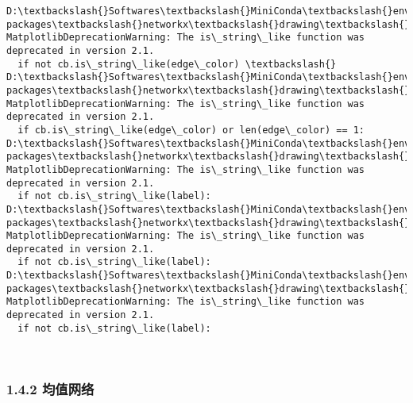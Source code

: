 \documentclass[11pt]{article}
\begin{document}
    \begin{Verbatim}[commandchars=\\\{\}]
D:\textbackslash{}Softwares\textbackslash{}MiniConda\textbackslash{}envs\textbackslash{}torch36\textbackslash{}lib\textbackslash{}site-packages\textbackslash{}networkx\textbackslash{}drawing\textbackslash{}nx\_pylab.py:522: MatplotlibDeprecationWarning: The is\_string\_like function was deprecated in version 2.1.
  if not cb.is\_string\_like(edge\_color) \textbackslash{}
D:\textbackslash{}Softwares\textbackslash{}MiniConda\textbackslash{}envs\textbackslash{}torch36\textbackslash{}lib\textbackslash{}site-packages\textbackslash{}networkx\textbackslash{}drawing\textbackslash{}nx\_pylab.py:543: MatplotlibDeprecationWarning: The is\_string\_like function was deprecated in version 2.1.
  if cb.is\_string\_like(edge\_color) or len(edge\_color) == 1:
D:\textbackslash{}Softwares\textbackslash{}MiniConda\textbackslash{}envs\textbackslash{}torch36\textbackslash{}lib\textbackslash{}site-packages\textbackslash{}networkx\textbackslash{}drawing\textbackslash{}nx\_pylab.py:724: MatplotlibDeprecationWarning: The is\_string\_like function was deprecated in version 2.1.
  if not cb.is\_string\_like(label):
D:\textbackslash{}Softwares\textbackslash{}MiniConda\textbackslash{}envs\textbackslash{}torch36\textbackslash{}lib\textbackslash{}site-packages\textbackslash{}networkx\textbackslash{}drawing\textbackslash{}nx\_pylab.py:724: MatplotlibDeprecationWarning: The is\_string\_like function was deprecated in version 2.1.
  if not cb.is\_string\_like(label):
D:\textbackslash{}Softwares\textbackslash{}MiniConda\textbackslash{}envs\textbackslash{}torch36\textbackslash{}lib\textbackslash{}site-packages\textbackslash{}networkx\textbackslash{}drawing\textbackslash{}nx\_pylab.py:724: MatplotlibDeprecationWarning: The is\_string\_like function was deprecated in version 2.1.
  if not cb.is\_string\_like(label):

    \end{Verbatim}

    \begin{center}
    \end{center}
    { \hspace*{\fill} \\}
    
    \hypertarget{ux5747ux503cux7f51ux7edc}{%
\subsubsection{1.4.2 均值网络}\label{ux5747ux503cux7f51ux7edc}}
\end{document}
